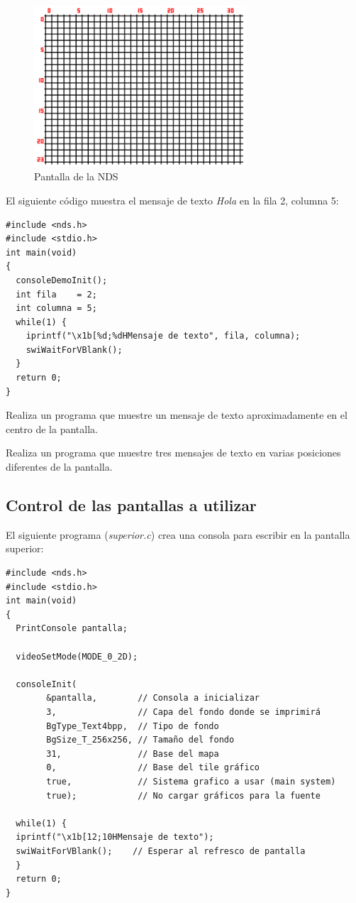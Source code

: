 \begin{figure}[t]
\centering
\includegraphics[height=6cm]{Figuras/C3/c3_eclipse12.png}
\caption{Pantalla de la NDS}
\label{fig_c3_texto}
\end{figure}

\begin{example}
El siguiente código muestra el mensaje de texto \textit{Hola} en la fila 2, columna 5:
\begin{lstlisting}
#include <nds.h>
#include <stdio.h>
int main(void)
{
  consoleDemoInit(); 
  int fila    = 2;
  int columna = 5;
  while(1) {
  	iprintf("\x1b[%d;%dHMensaje de texto", fila, columna);
  	swiWaitForVBlank();  
  }
  return 0;
}
\end{lstlisting}
\end{example}

\begin{exercise}
Realiza un programa que muestre un mensaje de texto aproximadamente en el centro de la pantalla. 
\end{exercise}

\begin{exercise}
Realiza un programa que muestre tres mensajes de texto en varias posiciones diferentes de la pantalla. 
\end{exercise}

\subsection{Control de las pantallas a utilizar}
El siguiente programa (\textit{superior.c}) crea una consola para escribir en la pantalla superior:
\begin{lstlisting}
#include <nds.h>
#include <stdio.h>
int main(void)
{
  PrintConsole pantalla;

  videoSetMode(MODE_0_2D);

  consoleInit(
  		&pantalla,        // Consola a inicializar
	    3,                // Capa del fondo donde se imprimirá
	    BgType_Text4bpp,  // Tipo de fondo
	    BgSize_T_256x256, // Tamaño del fondo
	    31,               // Base del mapa
	    0,                // Base del tile gráfico
	    true,             // Sistema grafico a usar (main system)
	    true);            // No cargar gráficos para la fuente

  while(1) {
  iprintf("\x1b[12;10HMensaje de texto");
  swiWaitForVBlank();    // Esperar al refresco de pantalla
  }
  return 0;
}
\end{lstlisting}

